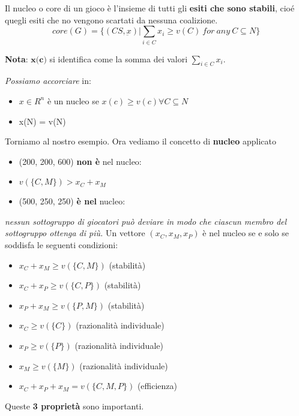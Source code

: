 \begin{definition}
    Il nucleo o core di un gioco è l'insieme di tutti gli \textbf{esiti che sono stabili}, cioé quegli
    esiti che no vengono scartati da nessuna coalizione.
    \[
        core(G) = \{(CS,\underbar{x}) | \sum_{i \in C} x_i \geq v(C) \ for \ any \ C \subseteq N\}\]
\end{definition}

\textbf{Nota}: $\textbf{x(c)}$ si identifica come la somma dei valori $\sum_{i \in C} x_i$.

\textit{Possiamo accorciare} in:

\begin{itemize}
    \item  $x \in R^n$ è un nucleo se $x(c) \geq v(c) \forall  C \subseteq N$ \\
    \item x(N) = v(N)
\end{itemize}

Torniamo al nostro esempio. Ora vediamo il concetto di \textbf{nucleo}
applicato

\begin{itemize}
    \item (200, 200, 600) \textbf{non è} nel nucleo:
    \item $v(\{C, M\}) > x_C + x_M$
    \item (500, 250, 250) \textbf{è nel} nucleo:
\end{itemize}

\textit{
    nessun sottogruppo di giocatori può deviare in modo che ciascun membro del sottogruppo ottenga di più.
}
Un vettore $(x_C, x_M, x_P)$ è nel nucleo se e solo se soddisfa le seguenti condizioni:
\begin{itemize}
    \item $x_C + x_M \geq v(\{C, M\})$ (stabilità)
    \item $x_C + x_P \geq v(\{C, P\})$ (stabilità)
    \item $x_P + x_M \geq v(\{P, M\})$ (stabilità)
    \item $x_C \geq v(\{C\})$ (razionalità individuale)
    \item $x_P \geq v(\{P\})$ (razionalità individuale)
    \item $x_M \geq v(\{M\})$ (razionalità individuale)
    \item $x_C + x_P + x_M = v(\{C, M, P\})$ (efficienza)
\end{itemize}

Queste \textbf{3 proprietà} sono importanti.

